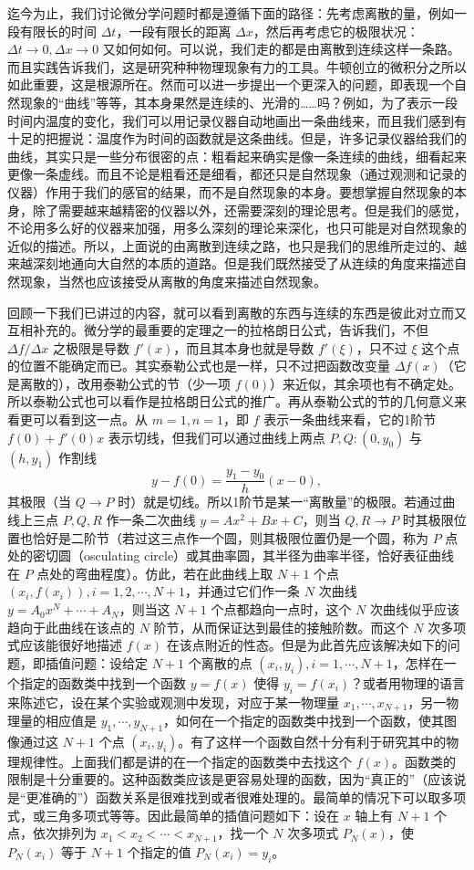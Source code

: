 迄今为止，我们讨论微分学问题时都是遵循下面的路径：先考虑离散的量，例如一段有限长的时间 $\Delta t$，一段有限长的距离 $\Delta x$，然后再考虑它的极限状况：$\Delta t\to0,\Delta x\to0$ 又如何如何。可以说，我们走的都是由离散到连续这样一条路。而且实践告诉我们，这是研究种种物理现象有力的工具。牛顿创立的微积分之所以如此重要，这是根源所在。然而可以进一步提出一个更深入的问题，即表现一个自然现象的“曲线”等等，其本身果然是连续的、光滑的……吗？例如，为了表示一段时间内温度的变化，我们可以用记录仪器自动地画出一条曲线来，而且我们感到有十足的把握说：温度作为时间的函数就是这条曲线。但是，许多记录仪器给我们的曲线，其实只是一些分布很密的点：粗看起来确实是像一条连续的曲线，细看起来更像一条虚线。而且不论是粗看还是细看，都还只是自然现象（通过观测和记录的仪器）作用于我们的感官的结果，而不是自然现象的本身。要想掌握自然现象的本身，除了需要越来越精密的仪器以外，还需要深刻的理论思考。但是我们的感觉，不论用多么好的仪器来加强，用多么深刻的理论来深化，也只可能是对自然现象的近似的描述。所以，上面说的由离散到连续之路，也只是我们的思维所走过的、越来越深刻地通向大自然的本质的道路。但是我们既然接受了从连续的角度来描述自然现象，当然也应该接受从离散的角度来描述自然现象。

回顾一下我们已讲过的内容，就可以看到离散的东西与连续的东西是彼此对立而又互相补充的。微分学的最重要的定理之一的拉格朗日公式，告诉我们，不但 $\Delta f/\Delta x$ 之极限是导数 $f'(x)$，而且其本身也就是导数 $f'(\xi)$，只不过 $\xi$ 这个点的位置不能确定而已。其实泰勒公式也是一样，只不过把函数改变量 $\Delta f(x)$（它是离散的），改用泰勒公式的节（少一项 $f(0)$）来近似，其余项也有不确定处。所以泰勒公式也可以看作是拉格朗日公式的推广。再从泰勒公式的节的几何意义来看更可以看到这一点。从 $m=1,n=1$，即 $f$ 表示一条曲线来看，它的1阶节 $f(0)+f'(0)x$ 表示切线，但我们可以通过曲线上两点 $P,Q:(0,y_0)$ 与 $(h,y_1)$ 作割线
\[
 y-f(0)=\frac{y_1-y_0}{h}(x-0),
\]
其极限（当 $Q\to P$ 时）就是切线。所以1阶节是某一“离散量”的极限。若通过曲线上三点 $P,Q,R$ 作一条二次曲线 $y=Ax^2+Bx+C$，则当 $Q,R\to P$ 时其极限位置也恰好是二阶节（若过这三点作一个圆，则其极限位置仍是一个圆，称为 $P$ 点处的密切圆（osculating circle）或其曲率圆，其半径为曲率半径，恰好表征曲线在 $P$ 点处的弯曲程度）。仿此，若在此曲线上取 $N+1$ 个点 $(x_i,f(x_i)),i=1,2,\cdots,N+1$，并通过它们作一条 $N$ 次曲线 $y=A_0x^N+\cdots+A_N$，则当这 $N+1$ 个点都趋向一点时，这个 $N$ 次曲线似乎应该趋向于此曲线在该点的 $N$ 阶节，从而保证达到最佳的接触阶数。而这个 $N$ 次多项式应该能很好地描述 $f(x)$ 在该点附近的性态。但是为此首先应该解决如下的问题，即插值问题：设给定 $N+1$ 个离散的点 $(x_i,y_i),i=1,\cdots,N+1$，怎样在一个指定的函数类中找到一个函数 $y=f(x)$ 使得 $y_i=f(x_i)$？或者用物理的语言来陈述它，设在某个实验或观测中发现，对应于某一物理量 $x_1,\cdots,x_{N+1}$，另一物理量的相应值是 $y_1,\cdots,y_{N+1}$，如何在一个指定的函数类中找到一个函数，使其图像通过这 $N+1$ 个点 $(x_i,y_i)$。有了这样一个函数自然十分有利于研究其中的物理规律性。上面我们都是讲的在一个指定的函数类中去找这个 $f(x)$。函数类的限制是十分重要的。这种函数类应该是更容易处理的函数，因为“真正的”（应该说是“更准确的”）函数关系是很难找到或者很难处理的。最简单的情况下可以取多项式，或三角多项式等等。因此最简单的插值问题如下：设在 $x$ 轴上有 $N+1$ 个点，依次排列为 $x_1<x_2<\cdots<x_{N+1}$，找一个 $N$ 次多项式 $P_N(x)$，使 $P_N(x_i)$ 等于 $N+1$ 个指定的值 $P_N(x_i)=y_i$。

